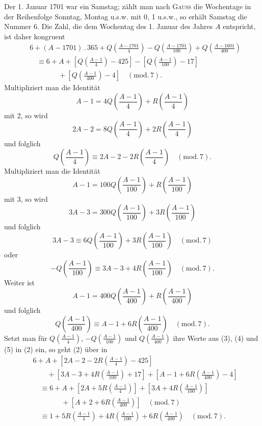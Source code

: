 Der 1. Januar 1701 war ein Samstag; zählt man nach \textsc{Gauss} die Wochentage in der Reihenfolge Sonntag, Montag u.s.w. mit 0, 1 u.s.w., so erhält Samstag die Nummer 6. Die Zahl, die dem Wochentag des 1. Januar des Jahres $A$ entspricht, ist daher kongruent
\begin{equation}
\begin{aligned}
&6+(A-1701)\mathbin{.}365+Q\left(\frac{A-1701}{4}\right)-Q\left(\frac{A-1701}{100}\right)+Q\left(\frac{A-1601}{400}\right)\\
&\quad\equiv6+A+\left[Q\left(\frac{A-1}{4}\right)-425\right]-\left[Q\left(\frac{A-1}{100}\right)-17\right]\\
&\qquad\qquad+\left[Q\left(\frac{A-1}{400}\right)-4\right]\quad(\mathrm{mod.}\,7).
\end{aligned}\tag*{(2)}
\end{equation}
\noindent Multipliziert man die Identität
\[
A-1=4Q\left(\frac{A-1}{4}\right)+R\left(\frac{A-1}{4}\right)
\]
\noindent mit 2, so wird
\[
2A-2=8Q\left(\frac{A-1}{4}\right)+2R\left(\frac{A-1}{4}\right)
\]
\noindent und folglich
\begin{equation}
Q\left(\frac{A-1}{4}\right)\equiv2A-2-2R\left(\frac{A-1}{4}\right)\quad(\mathrm{mod.}\,7).\tag*{(3)}
\end{equation}
\clearpage{}
\noindent Multipliziert man die Identität
\[
A-1=100Q\left(\frac{A-1}{100}\right)+R\left(\frac{A-1}{100}\right)
\]
\noindent mit 3, so wird
\[
3A-3=300Q\left(\frac{A-1}{100}\right)+3R\left(\frac{A-1}{100}\right)
\]
\noindent und folglich
\[
3A-3\equiv6Q\left(\frac{A-1}{100}\right)+3R\left(\frac{A-1}{100}\right)\quad(\mathrm{mod.}\,7)
\]
\noindent oder
\begin{equation}
-Q\left(\frac{A-1}{100}\right)\equiv3A-3+4R\left(\frac{A-1}{100}\right)\quad(\mathrm{mod.}\,7).\tag*{(4)}
\end{equation}
\noindent Weiter ist
\[
A-1=400Q\left(\frac{A-1}{400}\right)+R\left(\frac{A-1}{400}\right)
\]
\noindent und folglich
\begin{equation}
Q\left(\frac{A-1}{400}\right)\equiv A-1+6R\left(\frac{A-1}{400}\right)\quad(\mathrm{mod.}\,7).\tag*{(5)}
\end{equation}
\noindent Setzt man für $Q\left(\frac{A-1}{4}\right)$, $-Q\left(\frac{A-1}{100}\right)$ und $Q\left(\frac{A-1}{400}\right)$ ihre Werte aus (3), (4) und (5) in (2) ein, so geht (2) über in
\[
\begin{aligned}
&6+A+\left[2A-2-2R\left(\frac{A-1}{4}\right)-425\right]\\
&\qquad+\left[3A-3+4R\left(\frac{A-1}{100}\right)+17\right]+\left[A-1+6R\left(\frac{A-1}{400}\right)-4\right]\\
&\quad\equiv6+A+\left[2A+5R\left(\frac{A-1}{4}\right)\right]+\left[3A+4R\left(\frac{A-1}{100}\right)\right]\\
&\qquad\qquad+\left[A+2+6R\left(\frac{A-1}{400}\right)\right]\quad(\mathrm{mod.}\,7)\\
&\quad\equiv1+5R\left(\frac{A-1}{4}\right)+4R\left(\frac{A-1}{100}\right)+6R\left(\frac{A-1}{400}\right)\quad(\mathrm{mod.}\,7).
\end{aligned}
\]

